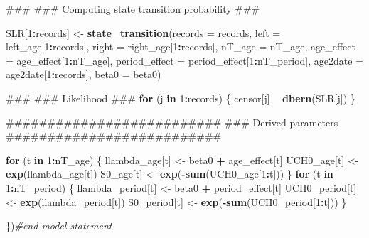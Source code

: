 \documentclass[11pt,]{article}
\newenvironment{Shaded}{\begin{snugshade}}{\end{snugshade}}
\newcommand{\KeywordTok}[1]{\textcolor[rgb]{0.13,0.29,0.53}{\textbf{#1}}}
\newcommand{\DataTypeTok}[1]{\textcolor[rgb]{0.13,0.29,0.53}{#1}}
\newcommand{\DecValTok}[1]{\textcolor[rgb]{0.00,0.00,0.81}{#1}}
\newcommand{\StringTok}[1]{\textcolor[rgb]{0.31,0.60,0.02}{#1}}
\newcommand{\CommentTok}[1]{\textcolor[rgb]{0.56,0.35,0.01}{\textit{#1}}}
\newcommand{\ControlFlowTok}[1]{\textcolor[rgb]{0.13,0.29,0.53}{\textbf{#1}}}
\newcommand{\OperatorTok}[1]{\textcolor[rgb]{0.81,0.36,0.00}{\textbf{#1}}}
\newcommand{\NormalTok}[1]{#1}
\begin{document}
\begin{Shaded}
\begin{Highlighting}[]
\NormalTok{  ###}
\NormalTok{  ### Computing state transition probability}
\NormalTok{  ###}

\NormalTok{  SLR[}\DecValTok{1}\OperatorTok{:}\NormalTok{records] <-}\StringTok{ }\KeywordTok{state_transition}\NormalTok{(}\DataTypeTok{records =}\NormalTok{ records,}
                                   \DataTypeTok{left =}\NormalTok{ left_age[}\DecValTok{1}\OperatorTok{:}\NormalTok{records],}
                                   \DataTypeTok{right =}\NormalTok{ right_age[}\DecValTok{1}\OperatorTok{:}\NormalTok{records],}
                                   \DataTypeTok{nT_age =}\NormalTok{ nT_age,}
                                   \DataTypeTok{age_effect =}\NormalTok{ age_effect[}\DecValTok{1}\OperatorTok{:}\NormalTok{nT_age],}
                                   \DataTypeTok{period_effect =}\NormalTok{ period_effect[}\DecValTok{1}\OperatorTok{:}\NormalTok{nT_period],}
                                   \DataTypeTok{age2date =}\NormalTok{ age2date[}\DecValTok{1}\OperatorTok{:}\NormalTok{records],}
                                   \DataTypeTok{beta0 =}\NormalTok{ beta0)}

\NormalTok{  ###}
\NormalTok{  ### Likelihood}
\NormalTok{  ###}
  \ControlFlowTok{for}\NormalTok{ (j }\ControlFlowTok{in} \DecValTok{1}\OperatorTok{:}\NormalTok{records) \{}
\NormalTok{    censor[j] }\OperatorTok{~}\StringTok{ }\KeywordTok{dbern}\NormalTok{(SLR[j])}
\NormalTok{  \}}

\NormalTok{  ##########################}
\NormalTok{  ### Derived parameters}
\NormalTok{  ##########################}

  \ControlFlowTok{for}\NormalTok{ (t }\ControlFlowTok{in} \DecValTok{1}\OperatorTok{:}\NormalTok{nT_age) \{}
\NormalTok{    llambda_age[t] <-}\StringTok{ }\NormalTok{beta0 }\OperatorTok{+}\StringTok{ }\NormalTok{age_effect[t]}
\NormalTok{    UCH0_age[t] <-}\StringTok{ }\KeywordTok{exp}\NormalTok{(llambda_age[t])}
\NormalTok{    S0_age[t] <-}\StringTok{ }\KeywordTok{exp}\NormalTok{(}\OperatorTok{-}\KeywordTok{sum}\NormalTok{(UCH0_age[}\DecValTok{1}\OperatorTok{:}\NormalTok{t]))}
\NormalTok{  \}}
  \ControlFlowTok{for}\NormalTok{ (t }\ControlFlowTok{in} \DecValTok{1}\OperatorTok{:}\NormalTok{nT_period) \{}
\NormalTok{    llambda_period[t] <-}\StringTok{ }\NormalTok{beta0 }\OperatorTok{+}\StringTok{ }\NormalTok{period_effect[t]}
\NormalTok{    UCH0_period[t] <-}\StringTok{ }\KeywordTok{exp}\NormalTok{(llambda_period[t])}
\NormalTok{    S0_period[t] <-}\StringTok{ }\KeywordTok{exp}\NormalTok{(}\OperatorTok{-}\KeywordTok{sum}\NormalTok{(UCH0_period[}\DecValTok{1}\OperatorTok{:}\NormalTok{t]))}
\NormalTok{  \}}

\NormalTok{\})}\CommentTok{#end model statement}
\end{Highlighting}
\end{Shaded}
\end{document}

